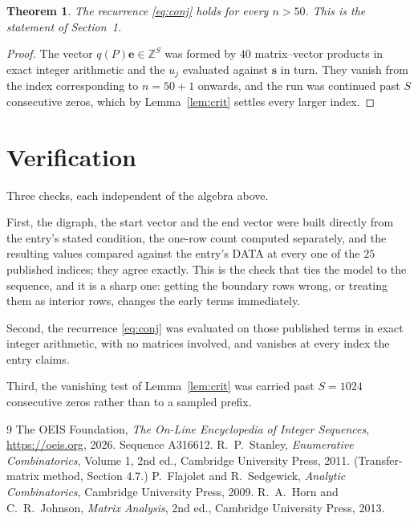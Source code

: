 \documentclass[11pt,a4paper]{article}
\theoremstyle{plain}
\newtheorem{theorem}{Theorem}
\theoremstyle{definition}
\begin{document}
\begin{theorem}
The recurrence \eqref{eq:conj} holds for every $n>50$. This is the statement of
Section~1.
\end{theorem}

\begin{proof}
The vector $q(P)\mathbf{e}\in\mathbb{Z}^{S}$ was formed by $40$ matrix--vector
products in exact integer arithmetic and the $u_j$ evaluated against $\mathbf{s}$ in turn.
They vanish from the index corresponding to $n=50+1$ onwards, and the run was continued
past $S$ consecutive zeros, which by Lemma~\ref{lem:crit} settles every larger index.
\end{proof}

\section{Verification}

Three checks, each independent of the algebra above.

First, the digraph, the start vector and the end vector were built directly from the
entry's stated condition, the one-row count computed separately, and the resulting values
compared against the entry's DATA at every one of the $25$ published indices; they
agree exactly. This is the check that ties the model to the sequence, and it is a sharp one:
getting the boundary rows wrong, or treating them as interior rows, changes the early terms
immediately.

Second, the recurrence \eqref{eq:conj} was evaluated on those published terms in exact
integer arithmetic, with no matrices involved, and vanishes at every index the entry claims.

Third, the vanishing test of Lemma~\ref{lem:crit} was carried past $S=1024$ consecutive
zeros rather than to a sampled prefix.

\begin{thebibliography}{9}
 The OEIS Foundation, \emph{The On-Line Encyclopedia of Integer
Sequences}, \url{https://oeis.org}, 2026. Sequence A316612.
 R.~P.~Stanley, \emph{Enumerative Combinatorics}, Volume 1, 2nd ed.,
Cambridge University Press, 2011. (Transfer-matrix method, Section 4.7.)
 P.~Flajolet and R.~Sedgewick, \emph{Analytic Combinatorics}, Cambridge
University Press, 2009.
 R.~A.~Horn and C.~R.~Johnson, \emph{Matrix Analysis}, 2nd ed., Cambridge
University Press, 2013.
\end{thebibliography}
\end{document}
